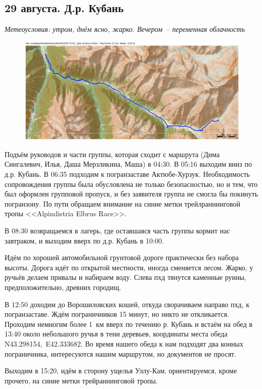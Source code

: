 \subsection{29 августа. Д.р. Кубань}
\textit{Метеоусловия: утром, днём ясно, жарко. Вечером~-- переменная облачность}

\begin{figure}[h!]
	\centering
	\includegraphics[angle=0, width=0.7\linewidth]{../pics/mini_maps/29}
	\label{fig:mini_29}
\end{figure}


Подъём руководов и части группы, которая сходит с маршрута (Дима Сингалевич, Илья, Даша Мерзликина, Маша) в 04:30. В 05:16 выходим вниз по д.р. Кубань. В 06:35 подходим к погранзаставе Актюбе-Хурзук. Необходимость сопровождения группы была обусловлена не только безопасностью, но и тем, что был оформлен групповой пропуск, и без заявителя группа не смогла бы покинуть погранзону. По пути обращаем внимание на синие метки трейлраннинговой тропы <<Alpindistria Elbrus Race>>.

В 08:30 возвращаемся в лагерь, где оставшаяся часть группы кормит нас завтраком, и выходим вверх по д.р. Кубань в 10:00.


Идём по хорошей автомобильной грунтовой дороге практически без набора высоты. Дорога идёт по открытой местности, иногда сменяется лесом. Жарко, у ручьёв делаем привалы и набираем воду. Слева пхд тянутся каменные руины, предположительно, древних городищ.


В 12:50 доходим до Ворошиловских кошей, откуда сворачиваем направо пхд, к погранзаставе. Ждём пограничников 15 минут, но никто не откликается. Проходим немногим более 1~км вверх по течению р. Кубань и встаём на обед в 13:40 около небольшого ручья в тени деревьев, координаты места обеда N43.298154\degree,~E42.333682\degree. Во время нашего обеда к нам подходят два конных пограничника, интересуются нашим маршрутом, но документов не просят.

Выходим в 15:20, идём в сторону ущелья Уллу-Кам, ориентируемся, кроме прочего, на синие метки трейраннинговой тропы.

